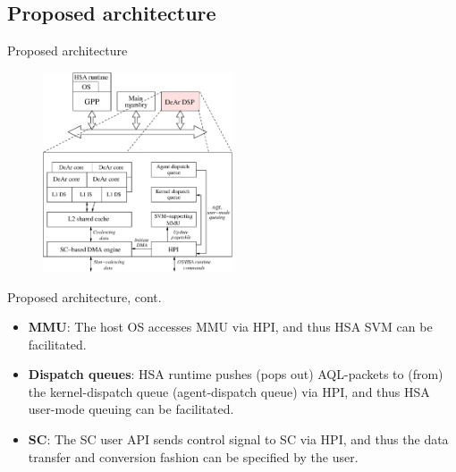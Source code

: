 \documentclass{beamer}
\begin{document}
\begin{CJK}{UTF8}{bkai}
    \subsection{Proposed architecture}
    \begin{frame}{Proposed architecture}
        \begin{figure}[!ht] 
            \centering
            \includegraphics[width=0.5\textwidth]{./figs/archi.eps}
            \label{fig:archi}
        \end{figure}
    \end{frame}

    \begin{frame}{Proposed architecture, cont.}
        \begin{itemize}
            \item {
                    \textbf{MMU}: The host OS accesses MMU via HPI, and thus HSA SVM can be facilitated.
                }
            \item {
                    \textbf{Dispatch queues}: HSA runtime pushes (pops out) AQL-packets to (from) the kernel-dispatch queue (agent-dispatch queue) via HPI, 
                    and thus HSA user-mode queuing can be facilitated.
                }

            \item {
                    \textbf{SC}: The SC user API sends control signal to SC via HPI, 
                    and thus the data transfer and conversion fashion can be specified by the user.
                }
        \end{itemize}
    \end{frame}


\end{CJK}
\end{document}
